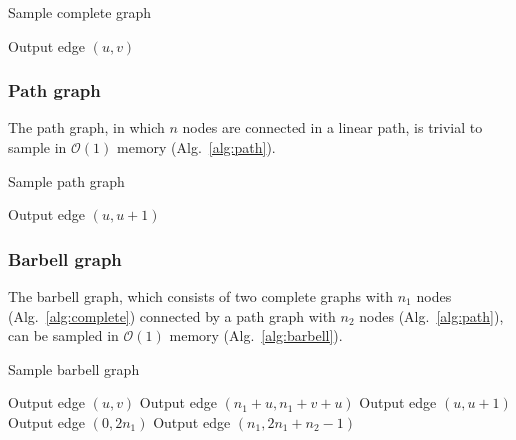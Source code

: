\documentclass[a4paper,num-refs,gigabyte]{oup-contemporary}
\begin{document}
\begin{algorithm}[H]
\caption{Sample complete graph}
\label{alg:complete}
\begin{algorithmic}
      \State Output edge $\left(u,v\right)$
    \EndFor
  \EndFor
\EndProcedure
\end{algorithmic}
\end{algorithm}

\subsubsection{Path graph}
The path graph, in which $n$ nodes are connected in a linear path, is trivial to sample in $\mathcal{O}\left(1\right)$ memory (Alg.~\ref{alg:path}).

\begin{algorithm}[H]
\caption{Sample path graph}
\label{alg:path}
\begin{algorithmic}
    \State Output edge $\left(u,u+1\right)$
  \EndFor
\EndProcedure
\end{algorithmic}
\end{algorithm}

\subsubsection{Barbell graph}
The barbell graph, which consists of two complete graphs with $n_1$ nodes (Alg.~\ref{alg:complete}) connected by a path graph with $n_2$ nodes (Alg.~\ref{alg:path}), can be sampled in $\mathcal{O}\left(1\right)$ memory (Alg.~\ref{alg:barbell}).

\begin{algorithm}[H]
\caption{Sample barbell graph}
\label{alg:barbell}
\begin{algorithmic}
      \State Output edge $\left(u,v\right)$
      \State Output edge $\left(n_1+u,n_1+v+u\right)$
    \EndFor
  \EndFor
    \State Output edge $\left(u,u+1\right)$
  \EndFor
  \State Output edge $\left(0,2n_1\right)$
  \State Output edge $\left(n_1,2n_1+n_2-1\right)$
\EndProcedure
\end{algorithmic}
\end{algorithm}
\end{document}
